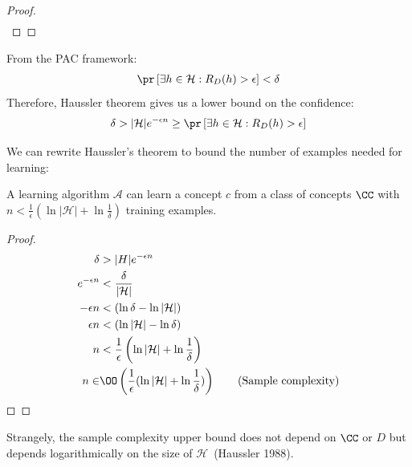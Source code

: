 \documentclass[
  letterpaper,
  12pt,
  british]{tufte-book}
\theoremstyle{plain}
\theoremstyle{definition}
\theoremstyle{plain}
\theoremstyle{remark}
\begin{document}
\begin{proof}
\begin{align}
\end{align} ~◻

\end{proof}

From the PAC framework: \begin{align}
    \pr\,[\exists h \in \mathcal{H}: R_{D}(h)>\epsilon] < \delta
\end{align} Therefore, Haussler theorem gives us a lower bound on the
confidence: \begin{align}
    \delta > |\mathcal{H}|e^{-\epsilon n} \geq \pr\,[\exists h \in \mathcal{H}: R_{D}(h)>\epsilon]\label{eq:delta}
\end{align}

We can rewrite Haussler's theorem to bound the number of examples needed
for learning:

\protect\hypertarget{th-sample_complexity}{}{}A learning algorithm
\(\mathcal{A}\) can learn a concept \(c\) from a class of concepts
\(\CC\) with
\(n < \frac{1}{\epsilon}(\ln{|\mathcal{H}|}+\ln{\frac{1}{\delta}})\)
training examples.

\begin{proof}

\begin{align}
    \delta &> |H|e^{-\epsilon n} \\
    e^{-\epsilon n} &< \frac{\delta}{|\mathcal{H}|}\\
    - \epsilon n &< (\ln{\delta} - \ln{|\mathcal{H}|}) \\
    \epsilon n &< (\ln{|\mathcal{H}|} - \ln{\delta}) \\
    n &< \frac{1}{\epsilon}\left(\ln{|\mathcal{H}|} + \ln{\frac{1}{\delta}}\right) \\
    n \in &\OO \left( \frac{1}{\epsilon}(\ln{|\mathcal{H}|} + \ln{\frac{1}{\delta}}) \right)\tag{Sample complexity}
\end{align} ◻

\end{proof}

Strangely, the sample complexity upper bound does not depend on \(\CC\)
or \(D\) but depends logarithmically on the size of
\(\mathcal{H}\)~(Haussler
1988).
\end{document}
